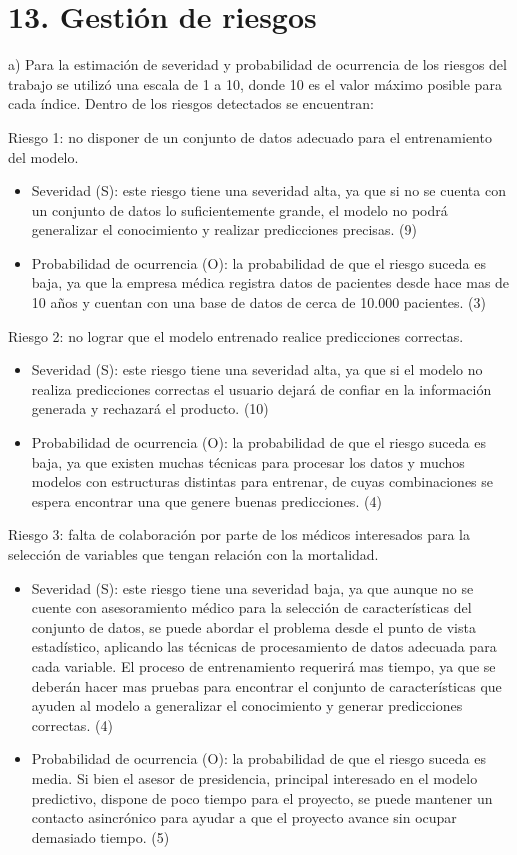 \documentclass[
11pt, %
]{charter}
\begin{document}
\section{13. Gestión de riesgos}
\label{sec:riesgos}

a) Para la estimación de severidad y probabilidad de ocurrencia de los riesgos del trabajo se utilizó una escala de 1 a 10, donde 10 es el valor máximo posible para cada índice. Dentro de los riesgos detectados se encuentran:

Riesgo 1: no disponer de un conjunto de datos adecuado para el entrenamiento del modelo.
\begin{itemize}
	\item Severidad (S): este riesgo tiene una severidad alta, ya que si no se cuenta con un conjunto de datos lo suficientemente grande, el modelo no podrá generalizar el conocimiento y realizar predicciones precisas. (9)
	\item Probabilidad de ocurrencia (O): la probabilidad de que el riesgo suceda es baja, ya que la empresa médica registra datos de pacientes desde hace mas de 10 años y cuentan con una base de datos de cerca de 10.000 pacientes. (3)
\end{itemize}   

Riesgo 2: no lograr que el modelo entrenado realice predicciones correctas.
\begin{itemize}
	\item Severidad (S): este riesgo tiene una severidad alta, ya que si el modelo no realiza predicciones correctas el usuario dejará de confiar en la información generada y rechazará el producto. (10)
	\item Probabilidad de ocurrencia (O): la probabilidad de que el riesgo suceda es baja, ya que existen muchas técnicas para procesar los datos y muchos modelos con estructuras distintas para entrenar, de cuyas combinaciones se espera encontrar una que genere buenas predicciones. (4)
\end{itemize} 

Riesgo 3: falta de colaboración por parte de los médicos interesados para la selección de variables que tengan relación con la mortalidad.
\begin{itemize}
	\item Severidad (S): este riesgo tiene una severidad baja, ya que aunque no se cuente con asesoramiento médico para la selección de características del conjunto de datos, se puede abordar el problema desde el punto de vista estadístico, aplicando las técnicas de procesamiento de datos adecuada para cada variable. El proceso de entrenamiento requerirá mas tiempo, ya que se deberán hacer mas pruebas para encontrar el conjunto de características que ayuden al modelo a generalizar el conocimiento y generar predicciones correctas. (4)
	\item Probabilidad de ocurrencia (O): la probabilidad de que el riesgo suceda es media. Si bien el asesor de presidencia, principal interesado en el modelo predictivo, dispone de poco tiempo para el proyecto, se puede mantener un contacto asincrónico para ayudar a que el proyecto avance sin ocupar demasiado tiempo. (5)
\end{itemize} 
\end{document}
